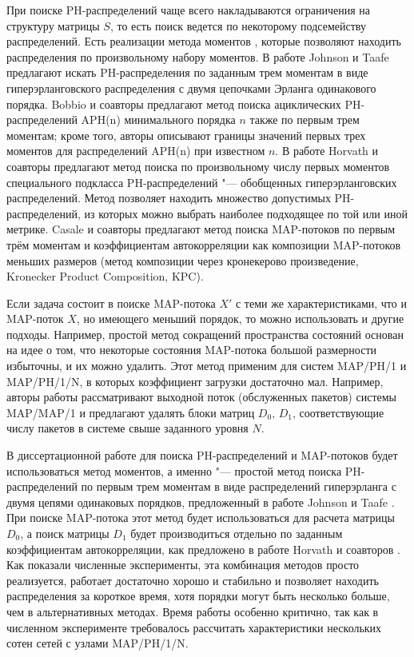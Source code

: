 При поиске PH-распределений чаще всего накладываются ограничения на структуру матрицы $S$, то есть поиск ведется по некоторому подсемейству распределений. Есть реализации метода моментов \cite{Johnson1989, Bobbio2005, Horvath2007, Horvath2013}, которые позволяют находить распределения по произвольному набору моментов. В работе Johnson и Taafe \cite{Johnson1989} предлагают искать PH-распределения по заданным трем моментам в виде гиперэрланговского распределения с двумя цепочками Эрланга одинакового порядка. Bobbio и соавторы \cite{Bobbio2005} предлагают метод поиска ациклических PH-распределений APH(n) минимального порядка $n$ также по первым трем моментам; кроме того, авторы описывают границы значений первых трех моментов для распределений APH(n) при известном $n$. В работе \cite{Horvath2013} Horvath и соавторы предлагают метод поиска по произвольному числу первых моментов специального подкласса PH-распределений "--- обобщенных гиперэрланговских распределений. Метод позволяет находить множество допустимых PH-распределений, из которых можно выбрать наиболее подходящее по той или иной метрике. Casale и соавторы \cite{Casale2010} предлагают метод поиска MAP-потоков по первым трём моментам и коэффициентам автокорреляции как композиции MAP-потоков меньших размеров (метод композиции через кронекерово произведение, Kronecker Product Composition, KPC).

Если задача состоит в поиске MAP-потока $X'$ с теми же характеристиками, что и MAP-поток $X$, но имеющего меньший порядок, то можно использовать и другие подходы. Например, простой метод сокращений пространства состояний основан на идее о том, что некоторые состояния MAP-потока большой размерности избыточны, и их можно удалить. Этот метод применим для систем MAP/PH/1 и MAP/PH/1/N, в которых коэффициент загрузки достаточно мал. Например, авторы работы \cite{Horvath2010} рассматривают выходной поток (обслуженных пакетов) системы MAP/MAP/1 и предлагают удалять блоки матриц $D_0,\,D_1$, соответствующие числу пакетов в системе свыше заданного уровня $N$.

В диссертационной работе для поиска PH-распределений и MAP-потоков будет использоваться метод моментов, а именно "--- простой метод поиска PH-распределений по первым трем моментам в виде распределений гиперэрланга с двумя цепями одинаковых порядков, предложенный в работе Johnson и Taafe \cite{Johnson1989}. При поиске MAP-потока этот метод будет использоваться для расчета матрицы $D_0$, а поиск матрицы $D_1$ будет производиться отдельно по заданным коэффициентам автокорреляции, как предложено в работе Horvath и соавторов \cite{Horvath2005}. Как показали численные эксперименты, эта комбинация методов просто реализуется, работает достаточно хорошо и стабильно и позволяет находить распределения за короткое время, хотя порядки могут быть несколько больше, чем в альтернативных методах. Время работы особенно критично, так как в численном эксперименте требовалось рассчитать характеристики нескольких сотен сетей с узлами MAP/PH/1/N.



